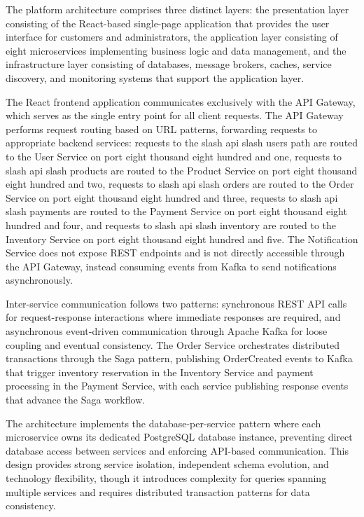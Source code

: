 The platform architecture comprises three distinct layers: the presentation layer consisting of the React-based single-page application that provides the user interface for customers and administrators, the application layer consisting of eight microservices implementing business logic and data management, and the infrastructure layer consisting of databases, message brokers, caches, service discovery, and monitoring systems that support the application layer.

The React frontend application communicates exclusively with the API Gateway, which serves as the single entry point for all client requests. The API Gateway performs request routing based on URL patterns, forwarding requests to appropriate backend services: requests to the slash api slash users path are routed to the User Service on port eight thousand eight hundred and one, requests to slash api slash products are routed to the Product Service on port eight thousand eight hundred and two, requests to slash api slash orders are routed to the Order Service on port eight thousand eight hundred and three, requests to slash api slash payments are routed to the Payment Service on port eight thousand eight hundred and four, and requests to slash api slash inventory are routed to the Inventory Service on port eight thousand eight hundred and five. The Notification Service does not expose REST endpoints and is not directly accessible through the API Gateway, instead consuming events from Kafka to send notifications asynchronously.

Inter-service communication follows two patterns: synchronous REST API calls for request-response interactions where immediate responses are required, and asynchronous event-driven communication through Apache Kafka for loose coupling and eventual consistency. The Order Service orchestrates distributed transactions through the Saga pattern, publishing OrderCreated events to Kafka that trigger inventory reservation in the Inventory Service and payment processing in the Payment Service, with each service publishing response events that advance the Saga workflow.

The architecture implements the database-per-service pattern where each microservice owns its dedicated PostgreSQL database instance, preventing direct database access between services and enforcing API-based communication. This design provides strong service isolation, independent schema evolution, and technology flexibility, though it introduces complexity for queries spanning multiple services and requires distributed transaction patterns for data consistency.

